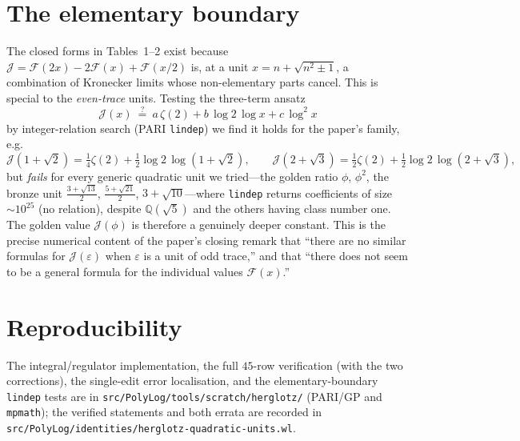 \documentclass[11pt]{article}
\newcommand{\eps}{\varepsilon}
\newcommand{\Jcal}{\mathcal{J}}
\theoremstyle{plain}\newtheorem{theorem}{Theorem}\newtheorem{proposition}[theorem]{Proposition}
\theoremstyle{remark}\newtheorem{remark}[theorem]{Remark}
\begin{document}
\section{The elementary boundary}
The closed forms in Tables~1--2 exist because $\Jcal=\mathcal F(2x)-2\mathcal F(x)+\mathcal F(x/2)$ is, at a
unit $x=n+\sqrt{n^2\pm1}$, a combination of Kronecker limits whose non-elementary parts cancel. This is
special to the \emph{even-trace} units. Testing the three-term ansatz
\[
  \Jcal(x)\ \overset{?}{=}\ a\,\zeta(2)+b\,\log2\,\log x+c\,\log^2 x
\]
by integer-relation search (PARI \texttt{lindep}) we find it holds for the paper's family, e.g.
\[
  \Jcal(1+\sqrt2)=\tfrac14\zeta(2)+\tfrac12\log2\,\log(1+\sqrt2),\qquad
  \Jcal(2+\sqrt3)=\tfrac12\zeta(2)+\tfrac12\log2\,\log(2+\sqrt3),
\]
but \emph{fails} for every generic quadratic unit we tried---the golden ratio $\phi$, $\phi^2$, the bronze
unit $\tfrac{3+\sqrt{13}}2$, $\tfrac{5+\sqrt{21}}2$, $3+\sqrt{10}$---where \texttt{lindep} returns
coefficients of size $\sim10^{25}$ (no relation), despite $\mathbb Q(\sqrt5)$ and the others having class
number one. The golden value $\Jcal(\phi)$ is therefore a genuinely deeper constant. This is the precise
numerical content of the paper's closing remark that ``there are no similar formulas for $\Jcal(\eps)$ when
$\eps$ is a unit of odd trace,'' and that ``there does not seem to be a general formula for the individual
values $\mathcal F(x)$.''

\section*{Reproducibility}
The integral/regulator implementation, the full $45$-row verification (with the two corrections), the
single-edit error localisation, and the elementary-boundary \texttt{lindep} tests are in
\texttt{src/PolyLog/tools/scratch/herglotz/} (PARI/GP and \texttt{mpmath}); the verified statements and
both errata are recorded in \texttt{src/PolyLog/identities/herglotz-quadratic-units.wl}.
\end{document}
